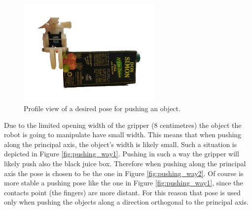 \begin{figure}[h]
\centering
\includegraphics[width=7cm]{Img/pushing/pushing1.png}
\caption{Profile view of a desired pose for pushing an object.}\label{fig:pushing_pose}
\end{figure}

Due to the limited opening width of the gripper (8 centimetres) the object the robot is going to manipulate have small width. This means that when pushing along the principal axis, the object's width is likely small. Such a situation is depicted in Figure \ref{fig:pushing_way1}. Pushing in such a way the gripper will likely push also the black juice box. Therefore when pushing along the principal axis the pose is chosen to be the one in Figure \ref{fig:pushing_way2}. Of course is more stable a pushing pose like the one in Figure \ref{fig:pushing_way1}, since the contacts point (the fingers) are more distant. For this reason that pose is used only when pushing the objects along a direction orthogonal to the principal axis. 


